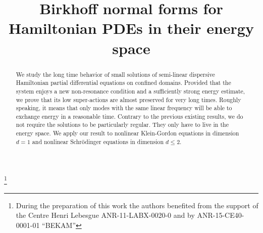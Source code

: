 \documentclass[JEP,XML,SOM,Unicode,NoEqCountersInSection,published]{cedram}
\theoremstyle{definition}
\begin{document}
\frontmatter
\title{Birkhoff normal forms for Hamiltonian PDEs in their energy space}

\author[\initial{J.} \lastname{Bernier}]{ }
\address{Nantes Université, CNRS, Laboratoire de Mathématiques Jean Leray, LMJL\\
F-44000 Nantes, France}

\author[\initial{B.} \lastname{Grébert}]{ }
\address{Nantes Université, CNRS, Laboratoire de Mathématiques Jean Leray, LMJL\\
F-44000 Nantes, France}

\thanks{During the preparation of this work the authors benefited from the support of the Centre Henri Lebesgue ANR-11-LABX-0020-0 and by ANR-15-CE40-0001-01 ``BEKAM''}



\begin{abstract}
We study the long time behavior of small solutions of semi-linear dispersive Hamiltonian partial differential equations on confined domains. Provided that the system enjoys a new non-resonance condition and a sufficiently strong energy estimate, we prove that its low super-actions are almost preserved for very long times. Roughly speaking, it means that only modes with the same linear frequency will be able to exchange energy in a reasonable time. Contrary to the previous existing results, we do not require the solutions to be particularly regular. They only have to live in the energy space. We apply our result to nonlinear Klein-Gordon equations in dimension $d=1$ and nonlinear Schrödinger equations in dimension $d\leq 2$.
\end{abstract}


\end{document}
